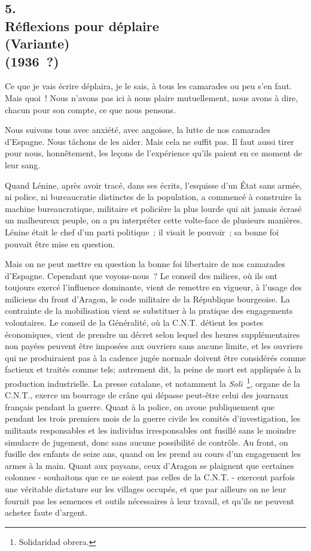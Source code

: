 \documentclass[french,twoside]{book} %
\begin{document}
\subsection[{5. Réflexions pour déplaire, (Variante) (1936 ?)}]{5. \\
Réflexions pour déplaire \\
(Variante) \\
(1936 ?)}
\noindent \par
Ce que je vais écrire déplaira, je le sais, à tous les camarades ou peu s'en faut. Mais quoi ! Nous n'avons pas ici à nous plaire mutuellement, nous avons à dire, chacun pour son compte, ce que nous pensons.\par
Nous suivons tous avec anxiété, avec angoisse, la lutte de nos camarades d'Espagne. Nous tâchons de les aider. Mais cela ne suffit pas. Il faut aussi tirer pour nous, honnêtement, les leçons de l'expérience qu'ils paient en ce moment de leur sang.\par
\par
Quand Lénine, après avoir tracé, dans ses écrits, l'esquisse d'un État sans armée, ni police, ni bureaucratie distinctes de la population, a commencé à construire la machine bureaucratique, militaire et policière la plus lourde qui ait jamais écrasé un malheureux peuple, on a pu interpréter cette volte-face de plusieurs manières. Lénine était le chef d'un parti politique ; il visait le pouvoir ; sa bonne foi pouvait être mise en question.\par
Mais on ne peut mettre en question la bonne foi libertaire de nos cama­rades d'Espagne. Cependant que voyons-nous ? Le conseil des milices, où ils ont toujours exercé l'influence dominante, vient de remettre en vigueur, à l'usage des miliciens du front d'Aragon, le code militaire de la République bourgeoise. La contrainte de la mobilisation vient se substituer à la pratique des engagements volontaires. Le conseil de la Généralité, où la C.N.T. détient les postes économiques, vient de prendre un décret selon lequel des heures supplémentaires non payées peuvent être imposées aux ouvriers sans aucune limite, et les ouvriers qui ne produiraient pas à la cadence jugée normale doivent être considérés comme factieux et traités comme tels; autrement dit, la peine de mort est appliquée à la production industrielle. La presse catalane, et notamment la {\itshape Soli} \footnote{Solidaridad obrera.}, organe de la C.N.T., exerce un bourrage de crâne qui dépasse peut-être celui des journaux français pendant la guerre. Quant à la police, on avoue publiquement que pendant les trois premiers mois de la guerre civile les comités d'investigation, les militants responsables et les individus irresponsables ont fusillé sans le moindre simulacre de jugement, donc sans aucune possibilité de contrôle. Au front, on fusille des enfants de seize ans, quand on les prend au cours d'un engagement les armes à la main. Quant aux paysans, ceux d'Aragon se plaignent que certaines colonnes - souhaitons que ce ne soient pas celles de la C.N.T. - exercent parfois une véritable dictature sur les villages occupés, et que par ailleurs on ne leur fournit pas les semences et outils nécessaires à leur travail, et qu'ils ne peuvent acheter faute d'argent.\par
\end{document}
